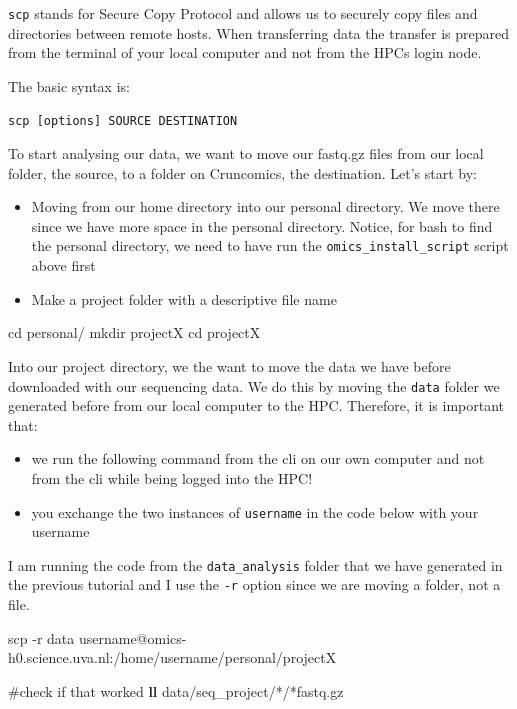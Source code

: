 \documentclass[
  letterpaper,
  DIV=11,
  numbers=noendperiod]{scrreprt}
\newenvironment{Shaded}{}{}
\newcommand{\AttributeTok}[1]{\textcolor[rgb]{0.84,0.23,0.29}{#1}}
\newcommand{\BuiltInTok}[1]{\textcolor[rgb]{0.84,0.23,0.29}{#1}}
\newcommand{\CommentTok}[1]{\textcolor[rgb]{0.42,0.45,0.49}{#1}}
\newcommand{\ExtensionTok}[1]{\textcolor[rgb]{0.84,0.23,0.29}{\textbf{#1}}}
\newcommand{\FunctionTok}[1]{\textcolor[rgb]{0.44,0.26,0.76}{#1}}
\newcommand{\NormalTok}[1]{\textcolor[rgb]{0.14,0.16,0.18}{#1}}
\newcommand{\PreprocessorTok}[1]{\textcolor[rgb]{0.84,0.23,0.29}{#1}}
\providecommand{\tightlist}{%
  \setlength{\itemsep}{0pt}\setlength{\parskip}{0pt}}\usepackage{longtable,booktabs,array}
\begin{document}
\texttt{scp} stands for Secure Copy Protocol and allows us to securely
copy files and directories between remote hosts. When transferring data
the transfer is prepared from the terminal of your local computer and
not from the HPCs login node.

The basic syntax is:

\texttt{scp\ {[}options{]}\ SOURCE\ DESTINATION}

To start analysing our data, we want to move our fastq.gz files from our
local folder, the source, to a folder on Cruncomics, the destination.
Let's start by:

\begin{itemize}
\tightlist
\item
  Moving from our home directory into our personal directory. We move
  there since we have more space in the personal directory. Notice, for
  bash to find the personal directory, we need to have run the
  \texttt{omics\_install\_script} script above first
\item
  Make a project folder with a descriptive file name
\end{itemize}

\begin{Shaded}
\begin{Highlighting}[]
\BuiltInTok{cd}\NormalTok{ personal/}
\FunctionTok{mkdir}\NormalTok{ projectX}
\BuiltInTok{cd}\NormalTok{ projectX}
\end{Highlighting}
\end{Shaded}

Into our project directory, we the want to move the data we have before
downloaded with our sequencing data. We do this by moving the
\texttt{data} folder we generated before from our local computer to the
HPC. Therefore, it is important that:

\begin{itemize}
\tightlist
\item
  we run the following command from the cli on our own computer and not
  from the cli while being logged into the HPC!
\item
  you exchange the two instances of \texttt{username} in the code below
  with your username
\end{itemize}

I am running the code from the \texttt{data\_analysis} folder that we
have generated in the previous tutorial and I use the \texttt{-r} option
since we are moving a folder, not a file.

\begin{Shaded}
\begin{Highlighting}[]
\FunctionTok{scp} \AttributeTok{{-}r}\NormalTok{ data username@omics{-}h0.science.uva.nl:/home/username/personal/projectX}

\CommentTok{\#check if that worked }
\ExtensionTok{ll}\NormalTok{ data/seq\_project/}\PreprocessorTok{*}\NormalTok{/}\PreprocessorTok{*}\NormalTok{fastq.gz}
\end{Highlighting}
\end{Shaded}
\end{document}
